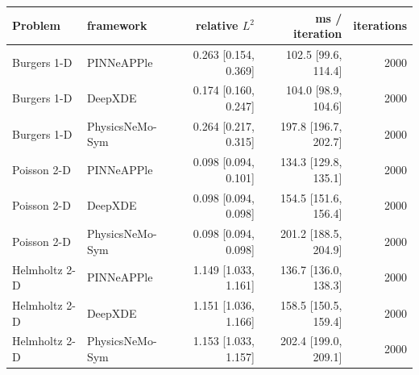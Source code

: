 \begin{tabular}{llrrr}
\toprule
Problem & framework & relative $L^2$ & ms / iteration & iterations \\
\midrule
Burgers 1-D & PINNeAPPle & 0.263 [0.154, 0.369] & 102.5 [99.6, 114.4] & 2000 \\
Burgers 1-D & DeepXDE & 0.174 [0.160, 0.247] & 104.0 [98.9, 104.6] & 2000 \\
Burgers 1-D & PhysicsNeMo-Sym & 0.264 [0.217, 0.315] & 197.8 [196.7, 202.7] & 2000 \\
\midrule
Poisson 2-D & PINNeAPPle & 0.098 [0.094, 0.101] & 134.3 [129.8, 135.1] & 2000 \\
Poisson 2-D & DeepXDE & 0.098 [0.094, 0.098] & 154.5 [151.6, 156.4] & 2000 \\
Poisson 2-D & PhysicsNeMo-Sym & 0.098 [0.094, 0.098] & 201.2 [188.5, 204.9] & 2000 \\
\midrule
Helmholtz 2-D & PINNeAPPle & 1.149 [1.033, 1.161] & 136.7 [136.0, 138.3] & 2000 \\
Helmholtz 2-D & DeepXDE & 1.151 [1.036, 1.166] & 158.5 [150.5, 159.4] & 2000 \\
Helmholtz 2-D & PhysicsNeMo-Sym & 1.153 [1.033, 1.157] & 202.4 [199.0, 209.1] & 2000 \\
\midrule
\bottomrule
\end{tabular}
